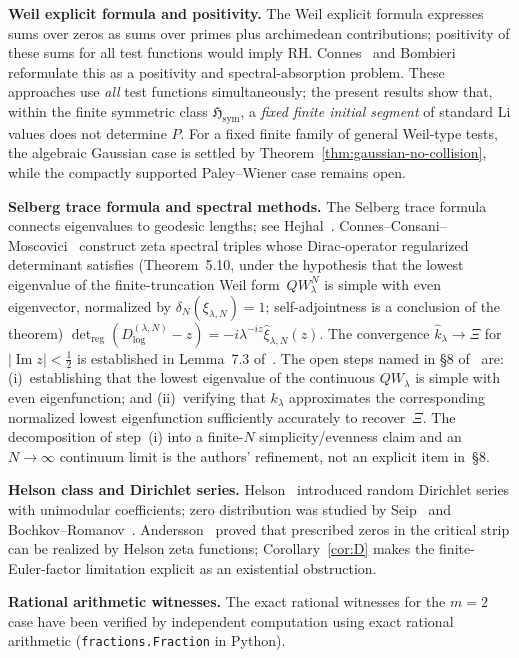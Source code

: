 \documentclass[12pt]{amsart}
\theoremstyle{definition}
\theoremstyle{remark}
\theoremstyle{plain}
\newcommand{\Hsym}{\mathfrak{H}_{\mathrm{sym}}}
\begin{document}
\textbf{Weil explicit formula and positivity.}
The Weil explicit formula expresses sums over zeros as sums over primes
plus archimedean contributions; positivity of these sums for all test
functions would imply RH.  Connes~\cite{ConnesWeilFF1999} and
Bombieri~\cite{Bombieri2000} reformulate this as a positivity and
spectral-absorption problem.  These approaches use \emph{all} test functions
simultaneously; the present results show that, within the finite symmetric
class $\Hsym$, a \emph{fixed finite initial segment} of standard Li values
does not determine $P$.  For a fixed finite family of general Weil-type
tests, the algebraic Gaussian case is settled by
Theorem~\ref{thm:gaussian-no-collision}, while the compactly supported
Paley--Wiener case remains open.

\textbf{Selberg trace formula and spectral methods.}
The Selberg trace formula connects eigenvalues to geodesic lengths;
see Hejhal~\cite{Hejhal1976}.  Connes--Consani--Moscovici~\cite{CCM2025}
construct zeta spectral triples whose Dirac-operator regularized determinant
satisfies (Theorem~5.10, under the hypothesis that the lowest eigenvalue of
the finite-truncation Weil form~$QW_\lambda^N$ is simple with even eigenvector,
normalized by $\delta_N(\xi_{\lambda,N})=1$; self-adjointness is a conclusion
of the theorem)
$\det_{\mathrm{reg}}(D_{\log}^{(\lambda,N)}-z)=-i\lambda^{-iz}\hat{\xi}_{\lambda,N}(z)$.
The convergence $\hat{k}_\lambda\to\Xi$ for $|\operatorname{Im}z|<\tfrac12$
is established in Lemma~7.3 of~\cite{CCM2025}.  The open steps named in \S8 of~\cite{CCM2025} are: (i)~establishing that
the lowest eigenvalue of the continuous $QW_\lambda$ is simple with even
eigenfunction; and (ii)~verifying that $k_\lambda$ approximates the
corresponding normalized lowest eigenfunction sufficiently accurately to
recover~$\Xi$.  The decomposition of step~(i) into a finite-$N$
simplicity/evenness claim and an $N\to\infty$ continuum limit is the
authors' refinement, not an explicit item in~\S8.

\textbf{Helson class and Dirichlet series.}
Helson~\cite{Helson1969} introduced random Dirichlet series with unimodular
coefficients; zero distribution was studied by Seip~\cite{Seip2020} and
Bochkov--Romanov~\cite{BochkovRomanov2022}.
Andersson~\cite{Andersson2024} proved that prescribed zeros in the critical
strip can be realized by Helson zeta functions; Corollary~\ref{cor:D} makes the
finite-Euler-factor limitation explicit as an existential obstruction.

\textbf{Rational arithmetic witnesses.}
The exact rational witnesses for the $m=2$ case have been verified by
independent computation using exact rational arithmetic
(\texttt{fractions.Fraction} in Python).
\end{document}
